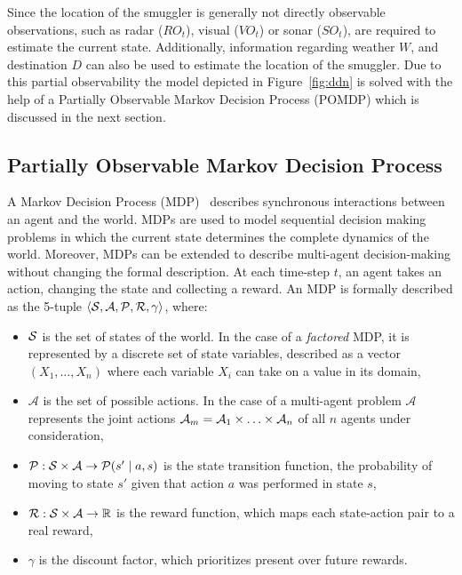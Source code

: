 \documentclass[conference]{IEEEtran}
\begin{document}
Since the location of the smuggler is generally not directly observable observations, such as radar ($RO_t$), visual ($VO_t$) or sonar ($SO_t$), are required to estimate the current state. Additionally, information regarding weather $W$, and destination $D$ can also be used to estimate the location of the smuggler. Due to this partial observability the model depicted in Figure~\ref{fig:ddn} is solved with the help of a Partially Observable Markov Decision Process (POMDP) which is discussed in the next section.


\subsection{Partially Observable Markov Decision Process}
\label{sub:pomdp}

A Markov Decision Process (MDP)~\cite{bellman1957dynamic,mdp} describes synchronous interactions between an agent and the world. MDPs are used to model sequential decision making problems in which the current state determines the complete dynamics of the world. Moreover, MDPs can be extended to describe multi-agent decision-making without changing the formal description. At each time-step $t$, an agent takes an action, changing the state and collecting a reward. An MDP is formally described as the 5-tuple $\langle\S,\mathcal{A},\P,\R,\gamma\rangle$, where:

\begin{itemize}
\item $\S$ is the set of states of the world. In the case of a \emph{factored} MDP, it is represented by a discrete set of state variables, described as a vector $\left(X_1,\ldots,X_n\right)$ where each variable $X_i$ can take on a value in its domain,
\item $\mathcal{A}$ is the set of possible actions. In the case of a multi-agent problem $\mathcal{A}$ represents the joint actions $\A_{m} = \A_1\times\ldots\times\A_n$ of all $n$ agents under consideration,
\item $\P:\S\times\mathcal{A}\to\P(s^\prime\mid a,s)$ is the state transition function, \ie the probability of moving to state $s'$ given that action $a$ was performed in state $s$,
\item $\R:\S\times\mathcal{A}\to\mathbb{R}$ is the reward function, which maps each state-action pair to a real reward,
\item $\gamma$ is the discount factor, which prioritizes present over future rewards.
\end{itemize}
\end{document}

